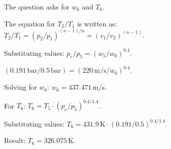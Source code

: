 The question asks for \( w_6 \) and \( T_6 \).  

The equation for \( T_2 / T_1 \) is written as:  
\( T_2 / T_1 = (p_2 / p_1)^{(n-1)/n} = (v_1 / v_2)^{(n-1)} \).  

Substituting values:  
\( p_e / p_5 = (w_5 / w_6)^{0.4} \).  

\( (0.191 \, \text{bar} / 0.5 \, \text{bar}) = (220 \, \text{m/s} / w_6)^{0.4} \).  

Solving for \( w_6 \):  
\( w_6 = 437.471 \, \text{m/s} \).  

For \( T_6 \):  
\( T_6 = T_5 \cdot (p_e / p_5)^{0.4 / 1.4} \).  

Substituting values:  
\( T_6 = 431.9 \, \text{K} \cdot (0.191 / 0.5)^{0.4 / 1.4} \).  

Result:  
\( T_6 = 326.075 \, \text{K} \).